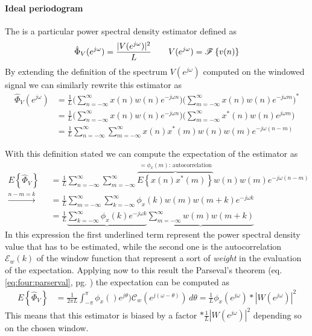 	\paragraph{Ideal periodogram} The  is a particular power spectral density estimator defined as
	\begin{equation}
		\hat \Phi_V(e^{j\omega}) = \frac{|V(e^{j\omega})|^2}{L} \qquad V(e^{j\omega}) = \mathscr{F}\left\{ v(n) \right\}
	\end{equation}
	By extending the definition of the spectrum $V(e^{j\omega})$ computed on the windowed signal we can similarly rewrite this estimator as
	\begin{align*}
		\hat \Phi_V(e^{j\omega}) & = \frac 1 L \Big( \sum_{n=-\infty}^\infty x(n) w(n) e^{-j\omega n} \Big)( \sum_{m=-\infty}^\infty x(n) w(n) e^{-j\omega m} \Big)^* \\ & = \frac 1 L \Big( \sum_{n=-\infty}^\infty x(n) w(n) e^{-j\omega n} \Big)( \sum_{m=-\infty}^\infty x^*(n) w(n) e^{j\omega m} \Big) \\ 
		& = \frac 1 L \sum_{n=-\infty}^\infty\sum_{m=-\infty}^\infty x(n) x^*(m) w(n) w(m) e^{-j\omega(n-m)}
	\end{align*}

	With this definition stated we can compute the expectation of the estimator as
	\begin{align*}
		E\left\{ \hat \Phi_V \right\} & = \frac 1 L \sum_{n=-\infty}^\infty\sum_{m=-\infty}^\infty \overbrace{E\left\{x(n) x^*(m)\right\}}^{= \phi_x(m) \textrm{: autocorrelation}} w(n) w(m) e^{-j\omega(n-m)} \\
		\xrightarrow{n-m=k} \quad & = \frac 1 L \sum_{m=-\infty}^\infty \sum_{k=-\infty}^\infty \phi_x(k) w(m) w(m+k) e^{-j\omega k} \\
		& = \frac 1 L \underbrace{\sum_{k=-\infty}^\infty \phi_x(k) e^{-j\omega k}} \underbrace{\sum_{m=-\infty}^\infty w(m) w(m+k)} 
	\end{align*}
	In this expression the first underlined term represent the power spectral density value that has to be estimated, while the second one is the autocorrelation $\mathcal E_w(k)$ of the window function that represent a sort of \textit{weight} in the evaluation of the expectation. Applying now to this result the Parseval's theorem (eq. \ref{eq:four:parserval}, pg. \pageref{eq:four:parserval}) the expectation can be computed as
	\begin{align*}
		E\left\{ \hat \Phi_V \right\} & = \frac 1 {2\pi L} \int_{-\pi}^\pi \phi_x ()e^{j\theta}) \mathcal C_w(e^{j(\omega-\theta)}) \, d\theta = \frac 1 L \phi_x (e^{j\omega}) * |W(e^{j\omega})|^2
	\end{align*}
	This means that this estimator is biased by a factor $*\frac1 L |W(e^{j\omega})|^2$ depending so on the chosen window.
	
	
	
	
	
	
	
	
	
	
	
	
	
	
	
	
	
	
	
	
	
	